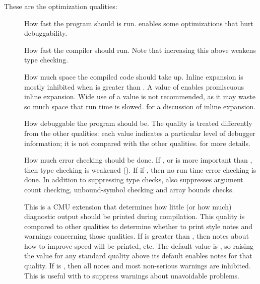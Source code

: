 These are the optimization qualities:
\begin{description}

\item[]
How fast the program should is run.
 enables some optimizations that hurt debuggability.

\item[]
How fast the compiler should
run.  Note that increasing this above  weakens type checking.

\item[]
How much space the compiled code should take
up.  Inline expansion is mostly inhibited when  is greater than
.  A value of  enables promiscuous inline expansion.  Wide use of
a  value is not recommended, as it may waste so much space that run time
is slowed.   for a discussion of inline
expansion.

\item[]
How debuggable the program should be.  The
quality is treated differently from the other qualities: each value indicates a
particular level of debugger information; it is not compared with the other
qualities.   for more details.

\item[]
How much error checking should be done.  If
,  or  is more important than
, then type checking is weakened ().  If  if , then no run time error
checking is done.  In addition to suppressing type checks,  also
suppresses argument count checking, unbound-symbol checking and array bounds
checks.

\item[]
This is a CMU extension that
determines how little (or how much) diagnostic output should be printed during
compilation.  This quality is compared to other qualities to determine whether
to print style notes and warnings concerning those qualities.  If  is
greater than , then notes about how to improve speed will
be printed, etc.  The default value is , so raising the value for any
standard quality above its default enables notes for that quality.  If
 is , then all notes and most non-serious warnings are
inhibited.  This is useful with  to suppress warnings about
unavoidable problems.
\end{description}

